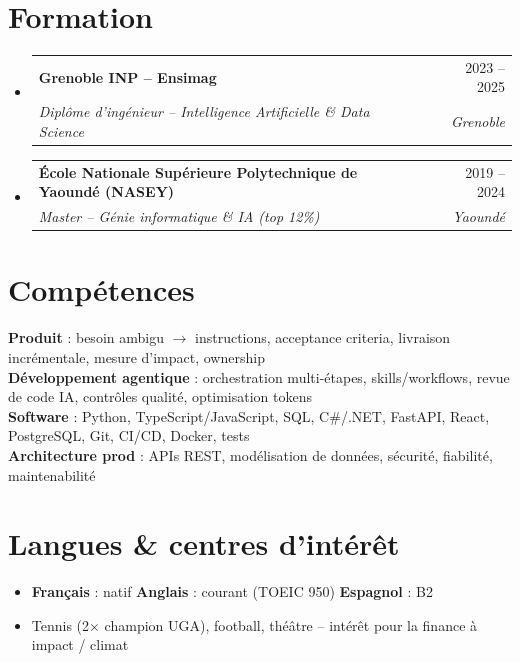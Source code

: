 \documentclass[a4paper,10.5pt]{extarticle}
\makeatletter
\newcommand{\resumeSubheading}[4]{
  \vspace{4pt}\item
  \begin{tabular*}{0.97\textwidth}[t]{l@{\extracolsep{\fill}}r}
    \textbf{#1} & #2 \\
    \textit{\small #3} & \textit{\small #4} \\
  \end{tabular*}\vspace{2pt}
}
\newcommand{\resumeSubHeadingListStart}{\begin{itemize}[leftmargin=0.08in,label={}]}
\newcommand{\resumeSubHeadingListEnd}{\end{itemize}}
\makeatother
\begin{document}
\section{Formation}
\resumeSubHeadingListStart
  \resumeSubheading
    {Grenoble INP -- Ensimag}{2023 -- 2025}
    {Dipl\^ome d'ing\'enieur -- Intelligence Artificielle \& Data Science}{Grenoble}
  \resumeSubheading
    {\'Ecole Nationale Sup\'erieure Polytechnique de Yaound\'e (NASEY)}{2019 -- 2024}
    {Master -- G\'enie informatique \& IA (top 12\%)}{Yaound\'e}
\resumeSubHeadingListEnd

\section{Comp\'etences}
\begin{itemize}[leftmargin=0.08in, label={}]
  \small{\item{
    \textbf{Produit} : besoin ambigu $\rightarrow$ instructions, acceptance criteria, livraison incr\'ementale, mesure d'impact, ownership \\[2pt]
    \textbf{D\'eveloppement agentique} : orchestration multi-\'etapes, skills/workflows, revue de code IA, contr\^oles qualit\'e, optimisation tokens \\[2pt]
    \textbf{Software} : Python, TypeScript/JavaScript, SQL, C\#/.NET, FastAPI, React, PostgreSQL, Git, CI/CD, Docker, tests \\[2pt]
    \textbf{Architecture prod} : APIs REST, mod\'elisation de donn\'ees, s\'ecurit\'e, fiabilit\'e, maintenabilit\'e
  }}
\end{itemize}

\section{Langues \& centres d'int\'er\^et}
\begin{itemize}[leftmargin=0.08in, label={}]
  \item \textbf{Fran\c{c}ais} : natif \quad \textbf{Anglais} : courant (TOEIC 950) \quad \textbf{Espagnol} : B2
  \item Tennis (2$\times$ champion UGA), football, th\'e\^atre -- int\'er\^et pour la finance \`a impact / climat
\end{itemize}
\end{document}
